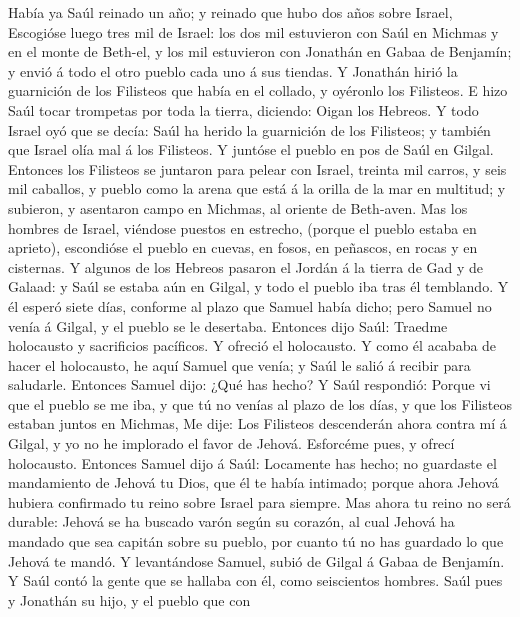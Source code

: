  Había ya Saúl reinado un año; y reinado que hubo dos años
sobre Israel,  Escogióse luego tres mil de Israel: los dos
mil estuvieron con Saúl en Michmas y en el monte de Beth-el, y los mil
estuvieron con Jonathán en Gabaa de Benjamín; y envió á todo el otro
pueblo cada uno á sus tiendas.  Y Jonathán hirió la
guarnición de los Filisteos que había en el collado, y oyéronlo los
Filisteos. E hizo Saúl tocar trompetas por toda la tierra, diciendo:
Oigan los Hebreos.  Y todo Israel oyó que se decía: Saúl ha
herido la guarnición de los Filisteos; y también que Israel olía mal á
los Filisteos. Y juntóse el pueblo en pos de Saúl en Gilgal.
 Entonces los Filisteos se juntaron para pelear con Israel,
treinta mil carros, y seis mil caballos, y pueblo como la arena que está
á la orilla de la mar en multitud; y subieron, y asentaron campo en
Michmas, al oriente de Beth-aven.  Mas los hombres de
Israel, viéndose puestos en estrecho, (porque el pueblo estaba en
aprieto), escondióse el pueblo en cuevas, en fosos, en peñascos, en
rocas y en cisternas.  Y algunos de los Hebreos pasaron el
Jordán á la tierra de Gad y de Galaad: y Saúl se estaba aún en Gilgal, y
todo el pueblo iba tras él temblando.  Y él esperó siete
días, conforme al plazo que Samuel había dicho; pero Samuel no venía á
Gilgal, y el pueblo se le desertaba.  Entonces dijo Saúl:
Traedme holocausto y sacrificios pacíficos. Y ofreció el holocausto.
 Y como él acababa de hacer el holocausto, he aquí Samuel
que venía; y Saúl le salió á recibir para saludarle. 
Entonces Samuel dijo: ¿Qué has hecho? Y Saúl respondió: Porque vi que el
pueblo se me iba, y que tú no venías al plazo de los días, y que los
Filisteos estaban juntos en Michmas,  Me dije: Los
Filisteos descenderán ahora contra mí á Gilgal, y yo no he implorado el
favor de Jehová. Esforcéme pues, y ofrecí holocausto. 
Entonces Samuel dijo á Saúl: Locamente has hecho; no guardaste el
mandamiento de Jehová tu Dios, que él te había intimado; porque ahora
Jehová hubiera confirmado tu reino sobre Israel para siempre.
 Mas ahora tu reino no será durable: Jehová se ha buscado
varón según su corazón, al cual Jehová ha mandado que sea capitán sobre
su pueblo, por cuanto tú no has guardado lo que Jehová te mandó.
 Y levantándose Samuel, subió de Gilgal á Gabaa de
Benjamín. Y Saúl contó la gente que se hallaba con él, como seiscientos
hombres.  Saúl pues y Jonathán su hijo, y el pueblo que con
